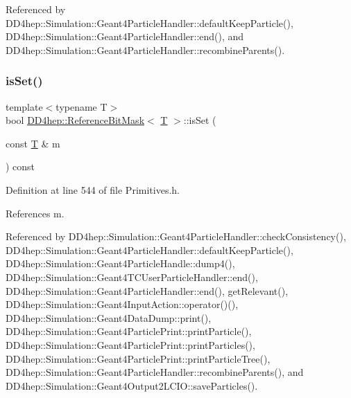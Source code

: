 Referenced by D\+D4hep\+::\+Simulation\+::\+Geant4\+Particle\+Handler\+::default\+Keep\+Particle(), D\+D4hep\+::\+Simulation\+::\+Geant4\+Particle\+Handler\+::end(), and D\+D4hep\+::\+Simulation\+::\+Geant4\+Particle\+Handler\+::recombine\+Parents().

\hypertarget{class_d_d4hep_1_1_reference_bit_mask_ad8c944401e10ede63f6291357d2e0fa6}{}\label{class_d_d4hep_1_1_reference_bit_mask_ad8c944401e10ede63f6291357d2e0fa6} 
\subsubsection{\texorpdfstring{is\+Set()}{isSet()}}
{\footnotesize\ttfamily template$<$typename T$>$ \\
bool \hyperlink{class_d_d4hep_1_1_reference_bit_mask}{D\+D4hep\+::\+Reference\+Bit\+Mask}$<$ \hyperlink{class_t}{T} $>$\+::is\+Set (\begin{DoxyParamCaption}\item[{const \hyperlink{class_t}{T} \&}]{m }\end{DoxyParamCaption}) const\hspace{0.3cm}{\ttfamily [inline]}}



Definition at line 544 of file Primitives.\+h.



References m.



Referenced by D\+D4hep\+::\+Simulation\+::\+Geant4\+Particle\+Handler\+::check\+Consistency(), D\+D4hep\+::\+Simulation\+::\+Geant4\+Particle\+Handler\+::default\+Keep\+Particle(), D\+D4hep\+::\+Simulation\+::\+Geant4\+Particle\+Handle\+::dump4(), D\+D4hep\+::\+Simulation\+::\+Geant4\+T\+C\+User\+Particle\+Handler\+::end(), D\+D4hep\+::\+Simulation\+::\+Geant4\+Particle\+Handler\+::end(), get\+Relevant(), D\+D4hep\+::\+Simulation\+::\+Geant4\+Input\+Action\+::operator()(), D\+D4hep\+::\+Simulation\+::\+Geant4\+Data\+Dump\+::print(), D\+D4hep\+::\+Simulation\+::\+Geant4\+Particle\+Print\+::print\+Particle(), D\+D4hep\+::\+Simulation\+::\+Geant4\+Particle\+Print\+::print\+Particles(), D\+D4hep\+::\+Simulation\+::\+Geant4\+Particle\+Print\+::print\+Particle\+Tree(), D\+D4hep\+::\+Simulation\+::\+Geant4\+Particle\+Handler\+::recombine\+Parents(), and D\+D4hep\+::\+Simulation\+::\+Geant4\+Output2\+L\+C\+I\+O\+::save\+Particles().

